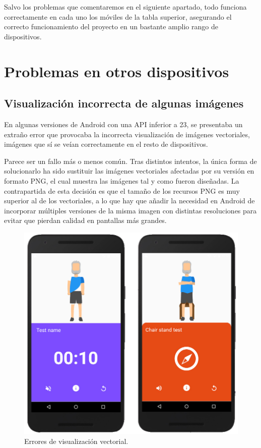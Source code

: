 Salvo los problemas que comentaremos en el siguiente apartado, todo funciona correctamente en cada uno los móviles de la tabla superior, asegurando el correcto funcionamiento del proyecto en un bastante amplio rango de dispositivos.

\section{Problemas en otros dispositivos}

\subsection{Visualización incorrecta de algunas imágenes}

En algunas versiones de Android con una API inferior a 23, se presentaba un extraño error que provocaba la incorrecta visualización de imágenes vectoriales, imágenes que sí se veían correctamente en el resto de dispositivos.

Parece ser un fallo más o menos común. Tras distintos intentos, la única forma de solucionarlo ha sido sustituir las imágenes vectoriales afectadas por su versión en formato PNG, el cual muestra las imágenes tal y como fueron diseñadas. La contrapartida de esta decisión es que el tamaño de los recursos PNG es muy superior al de los vectoriales, a lo que hay que añadir la necesidad en Android de incorporar múltiples versiones de la misma imagen con distintas resoluciones para evitar que pierdan calidad en pantallas más grandes.

\begin{figure}[H]
	\centering
	\includegraphics[scale=0.30]{imagenes/errores.jpg}
	\caption{Errores de visualización vectorial.\label{fig:errores}}
\end{figure}


